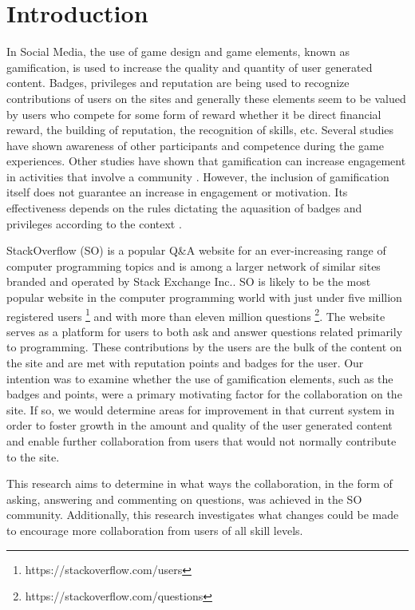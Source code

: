 \documentclass{sigchi}
\begin{document}


\section{Introduction}
In Social Media, the use of game design and game elements, known as gamification, is used to increase the quality and quantity of user generated content. Badges, privileges and reputation are being used to recognize contributions of users on the sites and generally these elements seem to be valued by users who compete for some form of reward whether it be direct financial reward, the building of reputation, the recognition of skills, etc. Several studies have shown awareness of other participants and competence during the game experiences\cite{Rughinis}. Other studies have shown that gamification can increase engagement in activities that involve a community \cite{Marder}. However, the inclusion of gamification itself does not guarantee an increase in engagement or motivation. Its effectiveness depends on the rules dictating the aquasition of badges and privileges according to the context \cite{Deterding}.

StackOverflow (SO) is a popular Q\&A website for an ever-increasing range of computer programming topics and is among a larger network of similar sites branded and operated by Stack Exchange Inc.. SO is likely to be the most popular website in the computer programming world with just under five million registered users \footnote{https://stackoverflow.com/users} and with more than eleven million questions \footnote{https://stackoverflow.com/questions}. The website serves as a platform for users to both ask and answer questions related primarily to programming. These contributions by the users are the bulk of the content on the site and are met with reputation points and badges for the user. Our intention was to examine whether the use of gamification elements, such as the badges and points, were a primary motivating factor for the collaboration on the site. If so, we would determine areas for improvement in that current system in order to foster growth in the amount and quality of the user generated content and enable further collaboration from users that would not normally contribute to the site.

This research aims to determine in what ways the collaboration, in the form of asking, answering and commenting on questions, was achieved in the SO community.
Additionally, this research investigates what changes could be made to encourage more collaboration from users of all skill levels.
\end{document}
